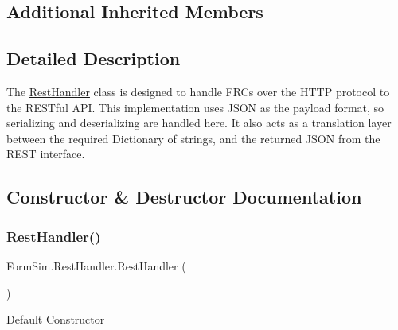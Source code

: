 \subsection*{Additional Inherited Members}


\subsection{Detailed Description}
The \mbox{\hyperlink{class_form_sim_1_1_rest_handler}{Rest\+Handler}} class is designed to handle F\+RC\textquotesingle{}s over the H\+T\+TP protocol to the R\+E\+S\+Tful A\+PI. This implementation uses J\+S\+ON as the payload format, so serializing and deserializing are handled here. It also acts as a translation layer between the required Dictionary of strings, and the returned J\+S\+ON from the R\+E\+ST interface. 



\subsection{Constructor \& Destructor Documentation}
\mbox{\label{class_form_sim_1_1_rest_handler_a138f2e1c350d4a14c51a0a27d36a13a8}} 
\subsubsection{\texorpdfstring{Rest\+Handler()}{RestHandler()}\hspace{0.1cm}{\footnotesize\ttfamily [1/3]}}
{\footnotesize\ttfamily Form\+Sim.\+Rest\+Handler.\+Rest\+Handler (\begin{DoxyParamCaption}{ }\end{DoxyParamCaption})\hspace{0.3cm}{\ttfamily [inline]}}



Default Constructor 

\mbox{\label{class_form_sim_1_1_rest_handler_a5a8e7dca756d6fa97fc472c1145af5cf}} 
